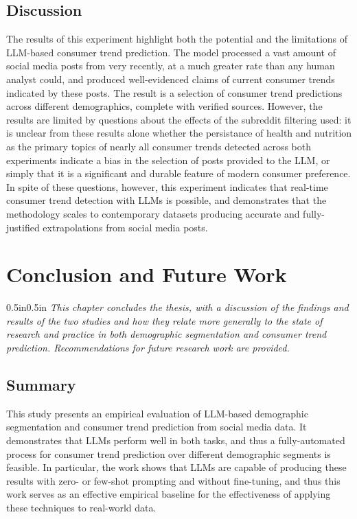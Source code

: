 \documentclass{report}
\begin{document}
\section{Discussion}

The results of this experiment highlight both the potential and the limitations of LLM-based consumer trend prediction. The model processed a vast amount of social media posts from very recently, at a much greater rate than any human analyst could, and produced well-evidenced claims of current consumer trends indicated by these posts. The result is a selection of consumer trend predictions across different demographics, complete with verified sources. However, the results are limited by questions about the effects of the subreddit filtering used: it is unclear from these results alone whether the persistance of health and nutrition as the primary topics of nearly all consumer trends detected across both experiments indicate a bias in the selection of posts provided to the LLM, or simply that it is a significant and durable feature of modern consumer preference. In spite of these questions, however, this experiment indicates that real-time consumer trend detection with LLMs is possible, and demonstrates that the methodology scales to contemporary datasets producing accurate and fully-justified extrapolations from social media posts.


\chapter{Conclusion and Future Work}

\begin{adjustwidth}{0.5in}{0.5in}
\textit{This chapter concludes the thesis, with a discussion of the findings and results of the two studies and how they relate more generally to the state of research and practice in both demographic segmentation and consumer trend prediction. Recommendations for future research work are provided.}
\end{adjustwidth}


\section{Summary}

This study presents an empirical evaluation of LLM-based demographic segmentation and consumer trend prediction from social media data. It demonstrates that LLMs perform well in both tasks, and thus a fully-automated process for consumer trend prediction over different demographic segments is feasible. In particular, the work shows that LLMs are capable of producing these results with zero- or few-shot prompting and without fine-tuning, and thus this work serves as an effective empirical baseline for the effectiveness of applying these techniques to real-world data.
\end{document}
